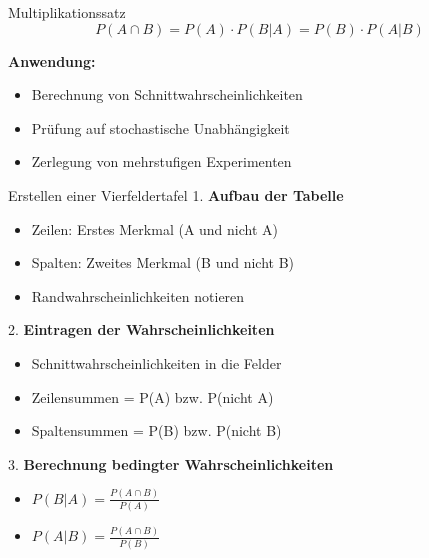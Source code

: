 \begin{theorem}{Multiplikationssatz}
$$P(A \cap B)=P(A) \cdot P(B|A)=P(B) \cdot P(A|B)$$

\textbf{Anwendung:}
\begin{itemize}
    \item Berechnung von Schnittwahrscheinlichkeiten
    \item Prüfung auf stochastische Unabhängigkeit
    \item Zerlegung von mehrstufigen Experimenten
\end{itemize}
\end{theorem}

\begin{KR}{Erstellen einer Vierfeldertafel}
1. \textbf{Aufbau der Tabelle}
   \begin{itemize}
   \item Zeilen: Erstes Merkmal (A und nicht A)
   \item Spalten: Zweites Merkmal (B und nicht B)
   \item Randwahrscheinlichkeiten notieren
   \end{itemize}

2. \textbf{Eintragen der Wahrscheinlichkeiten}
   \begin{itemize}
   \item Schnittwahrscheinlichkeiten in die Felder
   \item Zeilensummen = P(A) bzw. P(nicht A)
   \item Spaltensummen = P(B) bzw. P(nicht B)
   \end{itemize}

3. \textbf{Berechnung bedingter Wahrscheinlichkeiten}
   \begin{itemize}
   \item $P(B|A) = \frac{P(A \cap B)}{P(A)}$
   \item $P(A|B) = \frac{P(A \cap B)}{P(B)}$
   \end{itemize}
\end{KR}

